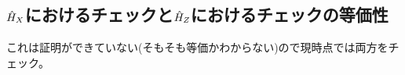 \documentclass[a4paper,11pt,dvipdfmx]{jsarticle}
\theoremstyle{definition}
\begin{document}
\subsection{$\hat{H}_X$におけるチェックと$\hat{H}_Z$におけるチェックの等価性}
これは証明ができていない(そもそも等価かわからない)ので現時点では両方をチェック。

\end{document}

